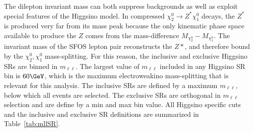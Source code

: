 The dilepton invariant mass can both suppress backgrounds as well as exploit special features of the Higgsino model.  In compressed $\chi_2^0\rightarrow Z^*\chi_1^0$ decays, the $Z^*$ is produced very far from its mass peak because the only kinematic phase space available to produce the $Z$ comes from the mass-difference $M_{\chi_2^0}-M_{\chi_1^0}$.  The invariant mass of the SFOS lepton pair reconstructs the $Z*$, and therefore bound by the $\chi_2^0,\chi_1^0$ mass-splitting.  For this reason, the inclusive and exclusive Higgsino SRs are binned in $m_{\ell\ell}$.  The largest value of $m_{\ell\ell}$ included in any Higgsino SR bin is $60\GeV$, which is the maximum electroweakino mass-splitting that is relevant for this analysis.  The inclusive SRs are defined by a maximum $m_{\ell\ell}$, below which all events are selected.  The exclusive SRs are orthogonal in $m_{\ell\ell}$ selection and are define by a min and max bin value.  All Higgsino specific cuts and the inclusive and exclusive SR definitions are summarized in Table~\ref{tab:mllSR}.
 \begin{table}[]
 \tiny
\centering
{}
\caption{Higgsino specific SR cuts and definitions.  SR definitions are expressed as bins in $m_{\ell\ell}$.}
\label{tab:mllSR}
\end{table}
\FloatBarrier
 
